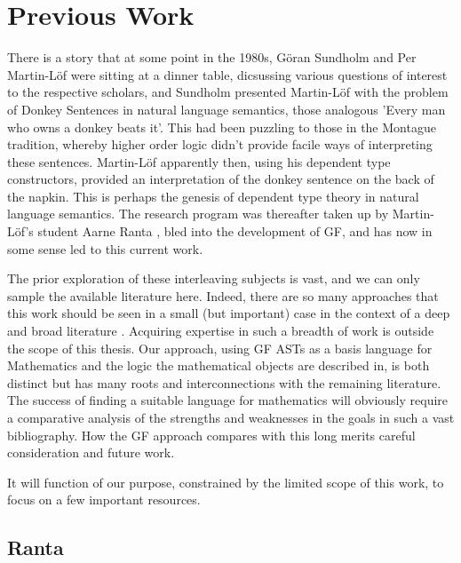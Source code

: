 \section{Previous Work}

There is a story that at some point in the 1980s, Göran Sundholm and Per
Martin-Löf were sitting at a dinner table, dicsussing various questions of
interest to the respective scholars, and Sundholm presented Martin-Löf with the
problem of Donkey Sentences in natural language semantics, those analogous
'Every man who owns a donkey beats it'. This had been puzzling to those in the
Montague tradition, whereby higher order logic didn't provide facile ways of
interpreting these sentences. Martin-Löf apparently then, using his dependent
type constructors, provided an interpretation of the donkey sentence on the back
of the napkin. This is perhaps the genesis of dependent type theory in natural
language semantics. The research program was thereafter taken up by Martin-Löf's
student Aarne Ranta \cite{ranta1994type}, bled into the development of GF, and
has now in some sense led to this current work.

The prior exploration of these interleaving subjects is vast, and we can only
sample the available literature here. Indeed, there are so many approaches that
this work should be seen in a small (but important) case in the context of a
deep and broad literature \cite{surveyLang}. Acquiring expertise in such a
breadth of work is outside the scope of this thesis. Our approach, using
GF ASTs as a basis language for Mathematics and the logic the mathematical
objects are described in, is both distinct but has many roots and
interconnections with the remaining literature. The success of finding a
suitable language for mathematics will obviously require a comparative analysis
of the strengths and weaknesses in the goals in such a vast bibliography. 
 How the GF approach compares with this long merits careful consideration and
 future work.

It will function of our purpose, constrained by the limited scope of this work,
to focus on a few important resources.

\subsection{Ranta}

